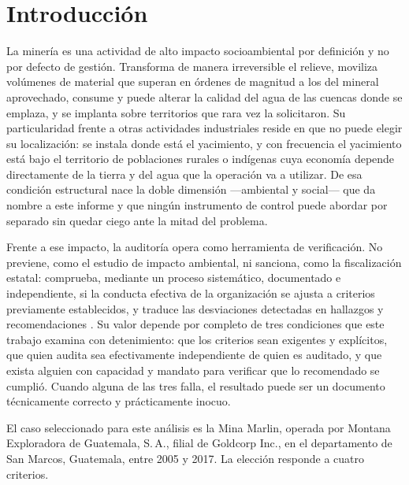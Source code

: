 
\section{Introducción}
\label{sec:introduccion}

La minería es una actividad de alto impacto socioambiental por definición y no por
defecto de gestión. Transforma de manera irreversible el relieve, moviliza
volúmenes de material que superan en órdenes de magnitud a los del mineral
aprovechado, consume y puede alterar la calidad del agua de las cuencas donde se
emplaza, y se implanta sobre territorios que rara vez la solicitaron. Su
particularidad frente a otras actividades industriales reside en que no puede
elegir su localización: se instala donde está el yacimiento, y con frecuencia el
yacimiento está bajo el territorio de poblaciones rurales o indígenas cuya
economía depende directamente de la tierra y del agua que la operación va a
utilizar. De esa condición estructural nace la doble dimensión —ambiental y
social— que da nombre a este informe y que ningún instrumento de control puede
abordar por separado sin quedar ciego ante la mitad del problema.

Frente a ese impacto, la auditoría opera como herramienta de verificación. No
previene, como el estudio de impacto ambiental, ni sanciona, como la fiscalización
estatal: comprueba, mediante un proceso sistemático, documentado e independiente,
si la conducta efectiva de la organización se ajusta a criterios previamente
establecidos, y traduce las desviaciones detectadas en hallazgos y recomendaciones
\parencite{iso2018iso19011}. Su valor depende por completo de tres condiciones
que este trabajo examina con detenimiento: que los criterios sean exigentes y
explícitos, que quien audita sea efectivamente independiente de quien es auditado,
y que exista alguien con capacidad y mandato para verificar que lo recomendado se
cumplió. Cuando alguna de las tres falla, el resultado puede ser un documento
técnicamente correcto y prácticamente inocuo.

El caso seleccionado para este análisis es la Mina Marlin, operada por Montana
Exploradora de Guatemala, S.\,A., filial de Goldcorp Inc., en el departamento de
San Marcos, Guatemala, entre 2005 y 2017. La elección responde a cuatro criterios.

